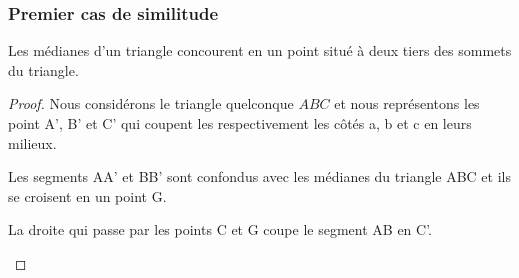 \documentclass[a4paper,12pt]{article}
\begin{document}
\pagebreak
\subsubsection{Premier cas de similitude}
\begin{theorem}
Les médianes d'un triangle concourent en un point situé à deux tiers des sommets du triangle.
\end{theorem}

\begin{proof}
Nous considérons le triangle quelconque $ABC$ et nous représentons les point A', B' et C' qui coupent les respectivement les côtés a, b et c en leurs milieux. 

\begin{hyp}
Les segments AA' et BB' sont confondus avec les médianes du triangle ABC et ils se croisent en un point G.
\end{hyp}

\begin{concl}
La droite qui passe par les points C et G coupe le segment AB en C'.
\end{concl}

\end{proof}
\end{document}
